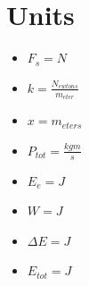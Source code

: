 \documentclass{article}
\begin{document}
\section{Units}
\begin{adjustwidth}{1cm}{0pt}
    \begin{minipage}{0.33\textwidth}
        \begin{itemize}
            \item $F_{s} = N$
            \item $k = \frac{N_{ewtons}}{m_{eter}}$
            \item $x = m_{eters}$
            \item $P_{tot} = \frac{kgm}{s}$
        \end{itemize}
    \end{minipage}
    \begin{minipage}{0.33\textwidth}
        \begin{itemize}
            \item $E_{e} = J$
            \item $W = J$
            \item $\Delta E = J$
            \item $E_{tot} = J$
        \end{itemize}
    \end{minipage}
\end{adjustwidth}

\vspace*{0.5cm}
\end{document}
